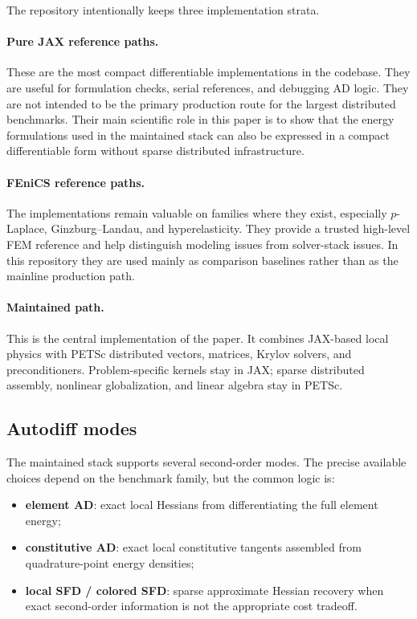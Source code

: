 \label{sec:implementation}

The repository intentionally keeps three implementation strata.

\paragraph{Pure JAX reference paths.}
These are the most compact differentiable implementations in the codebase.
They are useful for formulation checks, serial references, and debugging AD
logic. They are not intended to be the primary production route for the largest
distributed benchmarks. Their main scientific role in this paper is to show
that the energy formulations used in the maintained stack can also be expressed
in a compact differentiable form without sparse distributed infrastructure.

\paragraph{FEniCS reference paths.}
The \fenics{} implementations remain valuable on families where they exist,
especially $p$-Laplace, Ginzburg--Landau, and hyperelasticity. They provide a
trusted high-level FEM reference and help distinguish modeling issues from
solver-stack issues. In this repository they are used mainly as
comparison baselines rather than as the mainline production path.

\paragraph{Maintained \jaxpetsc{} path.}
This is the central implementation of the paper. It combines JAX-based local
physics with PETSc distributed vectors, matrices, Krylov solvers, and
preconditioners. Problem-specific kernels stay in JAX; sparse distributed
assembly, nonlinear globalization, and linear algebra stay in PETSc.

\subsection{Autodiff modes}

The maintained stack supports several second-order modes. The precise available
choices depend on the benchmark family, but the common logic is:
\begin{itemize}
  \item \textbf{element AD}: exact local Hessians from differentiating the full
        element energy;
  \item \textbf{constitutive AD}: exact local constitutive tangents assembled
        from quadrature-point energy densities;
  \item \textbf{local SFD / colored SFD}: sparse approximate Hessian recovery
        when exact second-order information is not the appropriate cost tradeoff.
\end{itemize}

